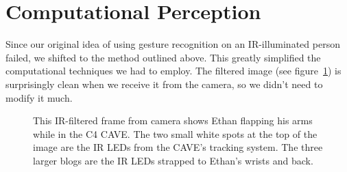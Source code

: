 \documentclass{article}
\begin{document}
\section{Computational Perception}
\label{sec:cv}

Since our original idea of using gesture recognition on an IR-illuminated
person failed, we shifted to the method outlined above.  This greatly
simplified the computational techniques we had to employ.  The filtered image
(see figure~\ref{fig:filtered-image}) is surprisingly clean when we receive it
from the camera, so we didn't need to modify it much.  

\begin{figure}[h!t]
\begin{center}
\end{center}
\caption{This IR-filtered frame from camera shows Ethan flapping his arms while in the C4 CAVE.  The two small white spots at the top of the image are the IR LEDs from the CAVE's tracking system.  The three larger blogs are the IR LEDs strapped to Ethan's wrists and back.}
\label{fig:filtered-image}
\end{figure}
\end{document}
